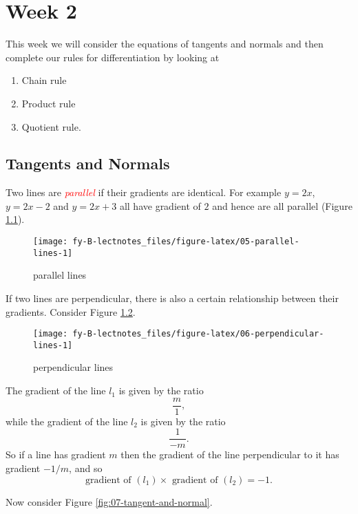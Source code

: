 \documentclass[
  11pt,
  oneside]{book}
\providecommand{\tightlist}{%
  \setlength{\itemsep}{0pt}\setlength{\parskip}{0pt}}
\newcommand{\slide}{}
\theoremstyle{definition}
\theoremstyle{definition}
\theoremstyle{definition}
\theoremstyle{definition}
\theoremstyle{remark}
\begin{document}
\chapter{Week 2}\label{week-two}

This week we will consider the equations of tangents and normals and then complete our rules for differentiation by looking at

\begin{enumerate}
\def\labelenumi{\arabic{enumi}.}
\tightlist
\item
  Chain rule
\item
  Product rule
\item
  Quotient rule.
\end{enumerate}

\slide

\section{Tangents and Normals}\label{lecture-four}

Two lines are \textcolor{red}{\em parallel} if their gradients are identical. For example \(y=2x\), \(y=2x-2\) and \(y=2x+3\) all have gradient of \(2\) and hence are all parallel (Figure \ref{fig:05-parallel-lines}).

\begin{figure}

{\centering \texttt{[image: fy-B-lectnotes\_files/figure-latex/05-parallel-lines-1]} 

}

\caption{parallel lines}\label{fig:05-parallel-lines}
\end{figure}
\slide

If two lines are perpendicular, there is also a certain relationship between their gradients. Consider Figure \ref{fig:06-perpendicular-lines}.

\begin{figure}

{\centering \texttt{[image: fy-B-lectnotes\_files/figure-latex/06-perpendicular-lines-1]} 

}

\caption{perpendicular lines}\label{fig:06-perpendicular-lines}
\end{figure}
\slide

The gradient of the line \(l_1\) is given by the ratio
\[
\frac{m}{1},
\]
while the gradient of the line \(l_2\) is given by the ratio
\[
\frac{1}{-m}.
\]
So if a line has gradient \(m\) then the gradient of the line perpendicular to it has gradient \(-1/m\), and so
\[
\text{gradient of }(l_1) \times \text{ gradient of }(l_2) = -1.
\]
\slide
Now consider Figure \ref{fig:07-tangent-and-normal}.
\end{document}
